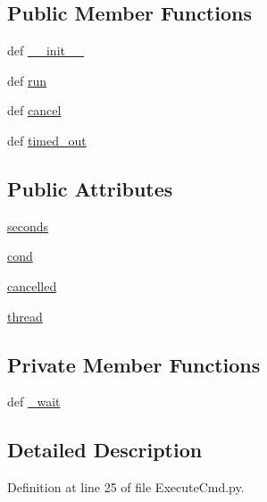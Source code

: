 \subsection*{Public Member Functions}
\begin{DoxyCompactItemize}
\item 
def \hyperlink{class_execute_cmd_1_1_timeout_thread_a9cd172ea1ce1f70bbdc71887be8de39b}{\-\_\-\-\_\-init\-\_\-\-\_\-}
\item 
def \hyperlink{class_execute_cmd_1_1_timeout_thread_a34f25443aac6dd070280eb7bad9bdba9}{run}
\item 
def \hyperlink{class_execute_cmd_1_1_timeout_thread_a991eb5d4f19ca7372f91b37be29924e5}{cancel}
\item 
def \hyperlink{class_execute_cmd_1_1_timeout_thread_a6de9f7a7e3d06d1c7c0f85f2b384b869}{timed\-\_\-out}
\end{DoxyCompactItemize}
\subsection*{Public Attributes}
\begin{DoxyCompactItemize}
\item 
\hyperlink{class_execute_cmd_1_1_timeout_thread_a93a3a333cc928cf7009ace5b8b568722}{seconds}
\item 
\hyperlink{class_execute_cmd_1_1_timeout_thread_ac654287e1bf651a90f45dd968e9d3c76}{cond}
\item 
\hyperlink{class_execute_cmd_1_1_timeout_thread_a134678f5a58c2493e0dd63f6264caacd}{cancelled}
\item 
\hyperlink{class_execute_cmd_1_1_timeout_thread_ae8c4ccc5d51f3383f5e53c556f27cc7a}{thread}
\end{DoxyCompactItemize}
\subsection*{Private Member Functions}
\begin{DoxyCompactItemize}
\item 
def \hyperlink{class_execute_cmd_1_1_timeout_thread_af046d96f23b1aafca10c9c8ae695255e}{\-\_\-wait}
\end{DoxyCompactItemize}


\subsection{Detailed Description}


Definition at line 25 of file Execute\-Cmd.\-py.



